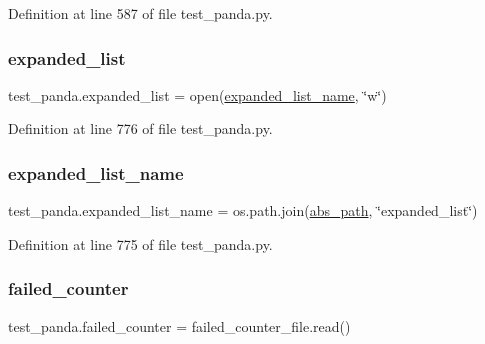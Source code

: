 Definition at line 587 of file test\+\_\+panda.\+py.

\mbox{\label{namespacetest__panda_ade223f0d3fedb6555ab1efdb9992732b}} 
\subsubsection{\texorpdfstring{expanded\+\_\+list}{expanded\_list}}
{\footnotesize\ttfamily test\+\_\+panda.\+expanded\+\_\+list = open(\hyperlink{namespacetest__panda_ad1931f0d30dc5508b22ea73a25760392}{expanded\+\_\+list\+\_\+name}, \char`\"{}w\char`\"{})}



Definition at line 776 of file test\+\_\+panda.\+py.

\mbox{\label{namespacetest__panda_ad1931f0d30dc5508b22ea73a25760392}} 
\subsubsection{\texorpdfstring{expanded\+\_\+list\+\_\+name}{expanded\_list\_name}}
{\footnotesize\ttfamily test\+\_\+panda.\+expanded\+\_\+list\+\_\+name = os.\+path.\+join(\hyperlink{namespacetest__panda_a78bb23566d04ac65a03195681449d2c0}{abs\+\_\+path}, \char`\"{}expanded\+\_\+list\char`\"{})}



Definition at line 775 of file test\+\_\+panda.\+py.

\mbox{\label{namespacetest__panda_a18cce99b42af4f268075fe72884430eb}} 
\subsubsection{\texorpdfstring{failed\+\_\+counter}{failed\_counter}}
{\footnotesize\ttfamily test\+\_\+panda.\+failed\+\_\+counter = failed\+\_\+counter\+\_\+file.\+read()}



